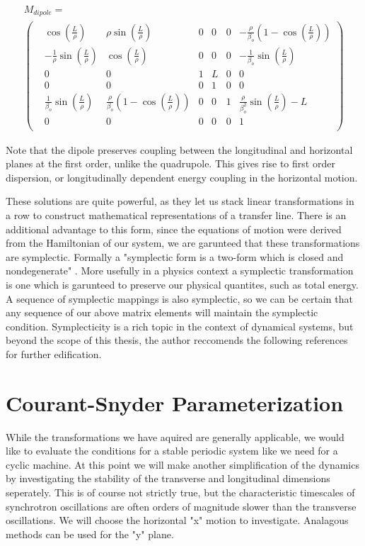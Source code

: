 \begin{multline} \label{mat:dipole}
	M_{dipole} = \\
\begin{pmatrix}
	&\cos{\left(\frac{L}{\rho}\right)} &\rho \sin{\left(\frac{L}{\rho}\right)} &0 &0 &0 &-\frac{\rho}{\beta_o}\left(1 - \cos{\left(\frac{L}{\rho}\right)}\right)\\
	&-\frac{1}{\rho}\sin{\left(\frac{L}{\rho}\right)} &\cos{\left(\frac{L}{\rho}\right)} &0 &0 &0 &-\frac{1}{\beta_o}\sin{\left(\frac{L}{\rho}\right)}\\
	&0 &0 &1 &L &0 &0\\
	&0 &0 &0 &1 &0 &0\\
	&\frac{1}{\beta_o}\sin{\left(\frac{L}{\rho}\right)} &\frac{\rho}{\beta_o}\left(1 - \cos{\left(\frac{L}{\rho}\right)}\right) &0 &0 &1 &\frac{\rho}{\beta_o^2}\sin{\left(\frac{L}{\rho}\right)} - L\\
	&0 &0 &0 &0 &0 &1\\
\end{pmatrix}
\end{multline}

Note that the dipole preserves coupling between the longitudinal and horizontal planes at the first order, unlike the quadrupole. This gives rise to first order dispersion, or longitudinally dependent energy coupling in the horizontal motion. 

These solutions are quite powerful, as they let us stack linear transformations in a row to construct mathematical representations of a transfer line. There is an additional advantage to this form, since the equations of motion were derived from the Hamiltonian of our system, we are garunteed that these transformations are symplectic. Formally a "symplectic form is a two-form which is closed and nondegenerate" \cite{JoseAndSalatan}. More usefully in a physics context a symplectic transformation is one which is garunteed to preserve our physical quantites, such as total energy. A sequence of symplectic mappings is also symplectic, so we can be certain that any sequence of our above matrix elements will maintain the symplectic condition. Symplecticity is a rich topic in the context of dynamical systems, but beyond the scope of this thesis, the author reccomends the following references for further edification.

\section{Courant-Snyder Parameterization} \label{sec:CSparam}
While the transformations we have aquired are generally applicable, we would like to evaluate the conditions for a stable periodic system like we need for a cyclic machine. At this point we will make another simplification of the dynamics by investigating the stability of the transverse and longitudinal dimensions seperately. This is of course not strictly true, but the characteristic timescales of synchrotron oscillations are often orders of magnitude slower than the transverse oscillations. We will choose the horizontal "x" motion to investigate. Analagous methods can be used for the "y" plane.

